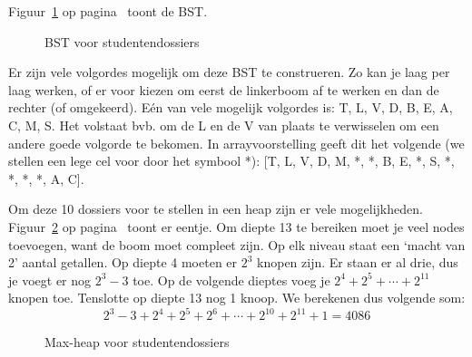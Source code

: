 \begin{Oplossing}{4.18}
Figuur~\ref{fig:bstexjuni19opl} op pagina~\pageref{fig:bstexjuni19opl} toont de BST.
\begin{figure}[htbp]
    \centering
{}
\caption{BST voor studentendossiers}
    \label{fig:bstexjuni19opl}
\end{figure}
Er zijn vele volgordes mogelijk om deze BST te construeren. Zo kan je laag per laag werken, of er voor kiezen om eerst de linkerboom af te werken en dan de rechter (of omgekeerd). Eén van vele mogelijk volgordes is: T, L, V, D, B, E, A, C, M, S. Het volstaat bvb. om de L en de V van plaats te verwisselen om een andere goede volgorde te bekomen. In arrayvoorstelling geeft dit het volgende (we stellen een lege cel voor door het symbool *): [T, L, V, D, M, *, *, B, E, *, S, *, *, *, *, A, C].

Om deze 10 dossiers voor te stellen in een heap zijn er vele mogelijkheden. Figuur~\ref{fig:bstexjuni19oplheap} op pagina~\pageref{fig:bstexjuni19oplheap} toont er eentje. Om diepte 13 te bereiken moet je veel nodes toevoegen, want de boom moet compleet zijn. Op elk niveau staat een ‘macht van 2’ aantal getallen. Op diepte 4 moeten er $2^3$ knopen zijn. Er staan er al drie, dus je voegt er nog $2^3 - 3$ toe. Op de volgende dieptes voeg je $2^4 + 2^5 + \cdots + 2^{11}$ knopen toe. Tenslotte op diepte 13 nog 1 knoop. We berekenen dus volgende som:
\[
2^3 - 3 + 2^4 + 2^5 + 2^6 + \cdots + 2^{10} + 2^{11} + 1 = 4086
\]
\begin{figure}[htbp]
    \centering
{}
\caption{Max-heap voor studentendossiers}
    \label{fig:bstexjuni19oplheap}
\end{figure}
\end{Oplossing}
